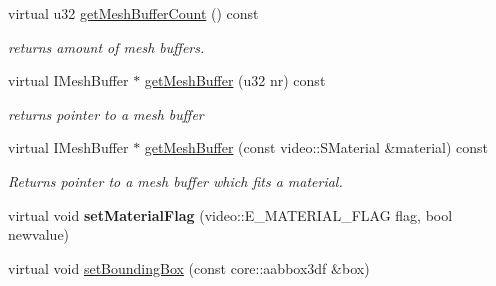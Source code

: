 \begin{DoxyCompactItemize}
\item 
\hypertarget{classirr_1_1scene_1_1_c_animated_mesh_m_d3_a2d3322358dce8c446fed56df1107b8fa}{virtual u32 \hyperlink{classirr_1_1scene_1_1_c_animated_mesh_m_d3_a2d3322358dce8c446fed56df1107b8fa}{get\-Mesh\-Buffer\-Count} () const }\label{classirr_1_1scene_1_1_c_animated_mesh_m_d3_a2d3322358dce8c446fed56df1107b8fa}

\begin{DoxyCompactList}\small\item\em returns amount of mesh buffers. \end{DoxyCompactList}\item 
\hypertarget{classirr_1_1scene_1_1_c_animated_mesh_m_d3_aee1e0fe63895eb809dde1d3c89c1f5dd}{virtual I\-Mesh\-Buffer $\ast$ \hyperlink{classirr_1_1scene_1_1_c_animated_mesh_m_d3_aee1e0fe63895eb809dde1d3c89c1f5dd}{get\-Mesh\-Buffer} (u32 nr) const }\label{classirr_1_1scene_1_1_c_animated_mesh_m_d3_aee1e0fe63895eb809dde1d3c89c1f5dd}

\begin{DoxyCompactList}\small\item\em returns pointer to a mesh buffer \end{DoxyCompactList}\item 
\hypertarget{classirr_1_1scene_1_1_c_animated_mesh_m_d3_a8b867158f4c64f9f42e30def2d378312}{virtual I\-Mesh\-Buffer $\ast$ \hyperlink{classirr_1_1scene_1_1_c_animated_mesh_m_d3_a8b867158f4c64f9f42e30def2d378312}{get\-Mesh\-Buffer} (const video\-::\-S\-Material \&material) const }\label{classirr_1_1scene_1_1_c_animated_mesh_m_d3_a8b867158f4c64f9f42e30def2d378312}

\begin{DoxyCompactList}\small\item\em Returns pointer to a mesh buffer which fits a material. \end{DoxyCompactList}\item 
\hypertarget{classirr_1_1scene_1_1_c_animated_mesh_m_d3_a367e68ea081e3de03e7973bb4dcaebf6}{virtual void {\bfseries set\-Material\-Flag} (video\-::\-E\-\_\-\-M\-A\-T\-E\-R\-I\-A\-L\-\_\-\-F\-L\-A\-G flag, bool newvalue)}\label{classirr_1_1scene_1_1_c_animated_mesh_m_d3_a367e68ea081e3de03e7973bb4dcaebf6}

\item 
\hypertarget{classirr_1_1scene_1_1_c_animated_mesh_m_d3_a73afcebe580f3729a07e37c9e1b82898}{virtual void \hyperlink{classirr_1_1scene_1_1_c_animated_mesh_m_d3_a73afcebe580f3729a07e37c9e1b82898}{set\-Bounding\-Box} (const core\-::aabbox3df \&box)}\label{classirr_1_1scene_1_1_c_animated_mesh_m_d3_a73afcebe580f3729a07e37c9e1b82898}


\end{DoxyCompactItemize}
